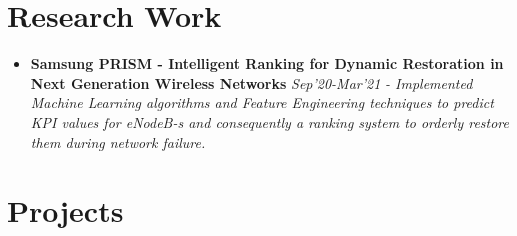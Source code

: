 \documentclass{article}
\begin{document}
\section*{Research Work}
\begin{itemize}
    \item{\textbf{\large{Samsung PRISM - Intelligent Ranking for Dynamic Restoration in Next Generation Wireless Networks}}} \hfill \textit{Sep'20-Mar'21}
          \newline
          \textit{- Implemented Machine Learning algorithms and Feature Engineering techniques to predict KPI values for eNodeB-s and consequently a ranking system
              to orderly restore them during network failure.}
\end{itemize}

\section*{Projects}
\end{document}
